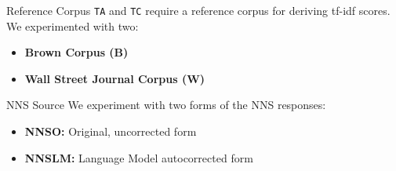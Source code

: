 \documentclass[final,t]{beamer}
\begin{document}
\begin{frame}{}
\begin{columns}[t]
\begin{column}{.64\linewidth}
\begin{columns}
\begin{column}{.48\linewidth}

\begin{block}{Reference Corpus}
\texttt{TA} and \texttt{TC} require a reference corpus for deriving tf-idf scores. We experimented with two:
\begin{center}
\begin{minipage}{.49\textwidth}
  \begin{mdframed}[innertopmargin=15pt,innerbottommargin=15pt,roundcorner=10pt]
  \begin{center}
  \begin{minipage}{.8\textwidth}
    \begin{itemize}
    \item{\textbf{Brown Corpus (B)}}
    \item{\textbf{Wall Street Journal Corpus (W)}}
    \end{itemize}
  \end{minipage}
  \end{center}
  \end{mdframed}
\end{minipage}
\end{center}
\vspace{-.5em}
\end{block}


\begin{block}{NNS Source}
We experiment with two forms of the NNS responses:
\begin{center}
\begin{minipage}{.6\textwidth}
  \begin{mdframed}[innertopmargin=15pt,innerbottommargin=15pt,roundcorner=10pt]
  \begin{center}
  \begin{minipage}{.85\textwidth}
    \begin{itemize}
	\item{\textbf{NNSO:} Original, uncorrected form}
	\item{\textbf{NNSLM:} Language Model autocorrected form}
    \end{itemize}
  \end{minipage}
  \end{center}
  \end{mdframed}
\end{minipage}
\end{center}
\vspace{-.5em}
\end{block}


\end{column}
\end{columns}
\end{column}
\end{columns}
\end{frame}
\end{document}
